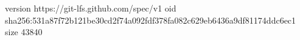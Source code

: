 version https://git-lfs.github.com/spec/v1
oid sha256:531a87f72b121be30cd2f74a092fdf378fa082c629eb6436a9df81174ddc6ec1
size 43840
